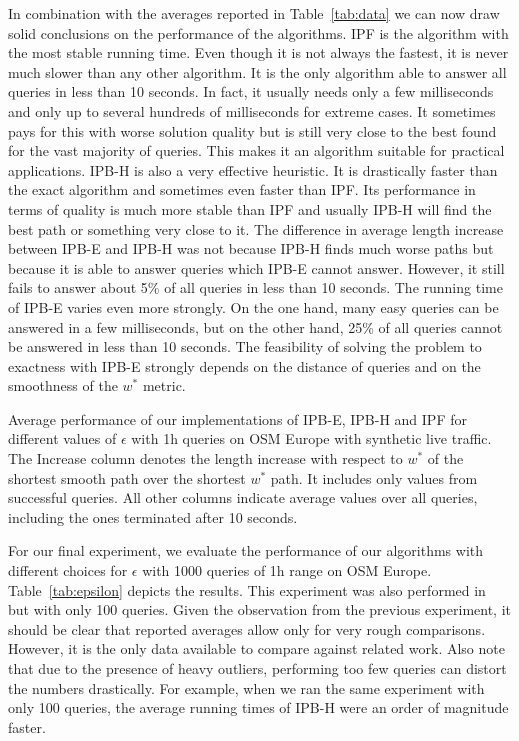 \documentclass[a4paper,UKenglish,cleveref, autoref, thm-restate]{lipics-v2021}
\begin{document}
In combination with the averages reported in Table~\ref{tab:data} we can now draw solid conclusions on the performance of the algorithms.
IPF is the algorithm with the most stable running time.
Even though it is not always the fastest, it is never much slower than any other algorithm.
It is the only algorithm able to answer all queries in less than 10 seconds.
In fact, it usually needs only a few milliseconds and only up to several hundreds of milliseconds for extreme cases.
It sometimes pays for this with worse solution quality but is still very close to the best found for the vast majority of queries.
This makes it an algorithm suitable for practical applications.
IPB-H is also a very effective heuristic.
It is drastically faster than the exact algorithm and sometimes even faster than IPF.
Its performance in terms of quality is much more stable than IPF and usually IPB-H will find the best path or something very close to it.
The difference in average length increase between IPB-E and IPB-H was not because IPB-H finds much worse paths but because it is able to answer queries which IPB-E cannot answer.
However, it still fails to answer about 5\% of all queries in less than 10 seconds.
The running time of IPB-E varies even more strongly.
On the one hand, many easy queries can be answered in a few milliseconds, but on the other hand, 25\% of all queries cannot be answered in less than 10 seconds.
The feasibility of solving the problem to exactness with IPB-E strongly depends on the distance of queries and on the smoothness of the $w^*$ metric.

\begin{table}[t]
\centering
\caption{
Average performance of our implementations of IPB-E, IPB-H and IPF for different values of $\epsilon$ with 1h queries on OSM Europe with synthetic live traffic.
The Increase column denotes the length increase with respect to $w^*$ of the shortest smooth path over the shortest $w^*$ path.
It includes only values from successful queries.
All other columns indicate average values over all queries, including the ones terminated after 10 seconds.
}\label{tab:epsilon}

\end{table}

For our final experiment, we evaluate the performance of our algorithms with different choices for $\epsilon$ with 1000 queries of 1h range on OSM Europe.
Table~\ref{tab:epsilon} depicts the results.
This experiment was also performed in~\cite{dss-tarrn-18} but with only 100 queries.
Given the observation from the previous experiment, it should be clear that reported averages allow only for very rough comparisons.
However, it is the only data available to compare against related work.
Also note that due to the presence of heavy outliers, performing too few queries can distort the numbers drastically.
For example, when we ran the same experiment with only 100 queries, the average running times of IPB-H were an order of magnitude faster.
\end{document}
